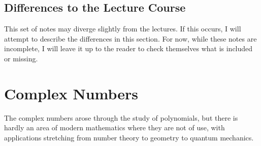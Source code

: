 \documentclass[a4]{scrreprt}
\begin{document}
\section{Differences to the Lecture Course}

This set of notes may diverge slightly from the lectures. If this occurs, I will attempt to describe the differences in this section.
For now, while these notes are incomplete, I will leave it up to the reader to check themselves what is included or missing.  




\chapter{Complex Numbers}

The complex numbers arose through the study of polynomials, but there is hardly an area of modern mathematics where they are not of use, with applications stretching from number theory to geometry to quantum mechanics.




\end{document}
